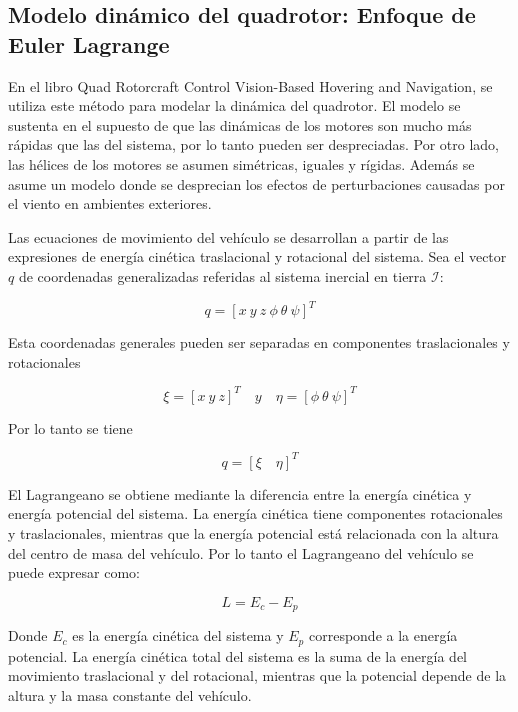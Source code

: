 \documentclass[../main.tex]{subfiles}
\begin{document}
\textcompwordmark{}

\subsection{Modelo dinámico del quadrotor: Enfoque de Euler Lagrange}

En el libro Quad Rotorcraft Control Vision-Based Hovering and Navigation,
se utiliza este método para modelar la dinámica del quadrotor. El
modelo se sustenta en el supuesto de que las dinámicas de los motores
son mucho más rápidas que las del sistema, por lo tanto pueden ser
despreciadas. Por otro lado, las hélices de los motores se asumen
simétricas, iguales y rígidas. Además se asume un modelo donde se
desprecian los efectos de perturbaciones causadas por el viento en
ambientes exteriores.

Las ecuaciones de movimiento del vehículo se desarrollan a partir
de las expresiones de energía cinética traslacional y rotacional del
sistema. Sea el vector $q$ de coordenadas
generalizadas referidas al sistema inercial en tierra $\mathcal{I}$:

\begin{equation}
q=[x\ y\ z\ \phi\ \theta\ \psi]^{T}
\end{equation}
 
Esta coordenadas generales pueden ser separadas en componentes traslacionales
y rotacionales

\begin{equation}
\xi=[x\ y\ z]^{T}\quad y\quad\eta=[\phi\ \theta\ \psi]^{T}
\end{equation}

Por lo tanto se tiene 

\begin{equation}
q=[\xi\quad\eta]^{T}
\end{equation}

El Lagrangeano se obtiene mediante la diferencia entre la energía
cinética y energía potencial del sistema. La energía cinética tiene
componentes rotacionales y traslacionales, mientras que la energía
potencial está relacionada con la altura del centro de masa del vehículo.
Por lo tanto el Lagrangeano del vehículo se puede expresar como:

\begin{equation}
L=E_{c}-E_{p}
\end{equation}

Donde $E_{c}$ es la energía cinética del sistema y $E_{p}$ corresponde
a la energía potencial. La energía cinética total del sistema es la
suma de la energía del movimiento traslacional y del rotacional, mientras
que la potencial depende de la altura y la masa constante del vehículo. 
\end{document}
